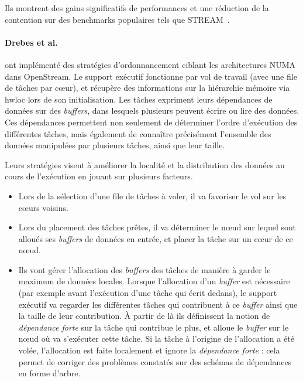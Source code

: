 Ils montrent des gains significatifs de performances et une réduction de la contention sur des benchmarks populaires tels que STREAM~\cite{mccalpin1995}.

\paragraph{Drebes et al.~\cite{Drebes2014}} ont implémenté des stratégies d'ordonnancement ciblant les architectures NUMA dans OpenStream.
Le support exécutif fonctionne par vol de travail (avec une file de tâches par cœur), et récupère des informations sur la hiérarchie mémoire via hwloc lors de son initialisation.
Les tâches expriment leurs dépendances de données sur des \emph{buffers}, dans lesquels plusieurs peuvent écrire ou lire des données.
Ces dépendances permettent non seulement de déterminer l'ordre d'exécution des différentes tâches, mais également de connaître précisément l'ensemble des données manipulées par plusieurs tâches, ainsi que leur taille.

Leurs stratégies visent à améliorer la localité et la distribution des données au cours de l'exécution en jouant sur plusieurs facteurs.
\begin{itemize}
  \item Lors de la sélection d'une file de tâches à voler, il va favoriser le vol sur les cœurs voisins.
  \item Lors du placement des tâches prêtes, il va déterminer le nœud sur lequel sont alloués ses \emph{buffers} de données en entrée, et placer la tâche sur un cœur de ce nœud.
  \item Ils vont gérer l'allocation des \emph{buffers} des tâches de manière à garder le maximum de données locales.
Lorsque l'allocation d'un \emph{buffer} est nécessaire (par exemple avant l'exécution d'une tâche qui écrit dedans), le support exécutif va regarder les différentes tâches qui contribuent à ce \emph{buffer} ainsi que la taille de leur contribution. À partir de là ils définissent la notion de \emph{dépendance forte} sur la tâche qui contribue le plus, et alloue le \emph{buffer} sur le nœud où va s'exécuter cette tâche.
Si la tâche à l'origine de l'allocation a été volée, l'allocation est faite localement et ignore la \emph{dépendance forte} : cela permet de corriger des problèmes constatés sur des schémas de dépendances en forme d'arbre.
\end{itemize}


